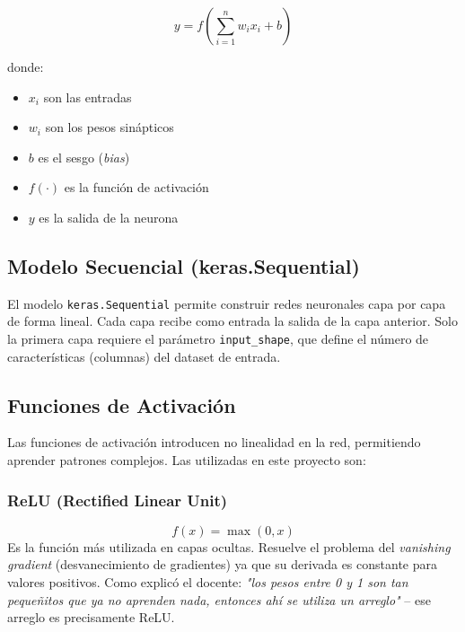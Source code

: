 \documentclass[12pt,a4paper]{article}
\begin{document}
\begin{equation}
    y = f\left(\sum_{i=1}^{n} w_i x_i + b\right)
\end{equation}

donde:
\begin{itemize}
    \item $x_i$ son las entradas
    \item $w_i$ son los pesos sinápticos
    \item $b$ es el sesgo (\textit{bias})
    \item $f(\cdot)$ es la función de activación
    \item $y$ es la salida de la neurona
\end{itemize}

\subsection{Modelo Secuencial (keras.Sequential)}

El modelo \texttt{keras.Sequential} permite construir redes neuronales capa por capa de forma lineal. Cada capa recibe como entrada la salida de la capa anterior. Solo la primera capa requiere el parámetro \texttt{input\_shape}, que define el número de características (columnas) del dataset de entrada.

\subsection{Funciones de Activación}

Las funciones de activación introducen no linealidad en la red, permitiendo aprender patrones complejos. Las utilizadas en este proyecto son:

\subsubsection{ReLU (Rectified Linear Unit)}
\begin{equation}
    f(x) = \max(0, x)
\end{equation}
Es la función más utilizada en capas ocultas. Resuelve el problema del \textit{vanishing gradient} (desvanecimiento de gradientes) ya que su derivada es constante para valores positivos. Como explicó el docente: \textit{"los pesos entre 0 y 1 son tan pequeñitos que ya no aprenden nada, entonces ahí se utiliza un arreglo"} -- ese arreglo es precisamente ReLU.

\end{document}
